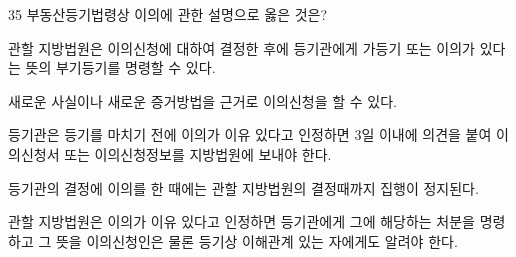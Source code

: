 \begin{question}{35}
부동산등기법령상 이의에 관한 설명으로 옳은 것은?
\begin{choices}
  \item 관할 지방법원은 이의신청에 대하여 결정한 후에 등기관에게 가등기 또는 이의가 있다는 뜻의 부기등기를 명령할 수 있다.
  \item 새로운 사실이나 새로운 증거방법을 근거로 이의신청을 할 수 있다.
  \item 등기관은 등기를 마치기 전에 이의가 이유 있다고 인정하면 3일 이내에 의견을 붙여 이의신청서 또는 이의신청정보를 지방법원에 보내야 한다.
  \item 등기관의 결정에 이의를 한 때에는 관할 지방법원의 결정때까지 집행이 정지된다.
  \item 관할 지방법원은 이의가 이유 있다고 인정하면 등기관에게 그에 해당하는 처분을 명령하고 그 뜻을 이의신청인은 물론 등기상 이해관계 있는 자에게도 알려야 한다.
\end{choices}
\end{question}
